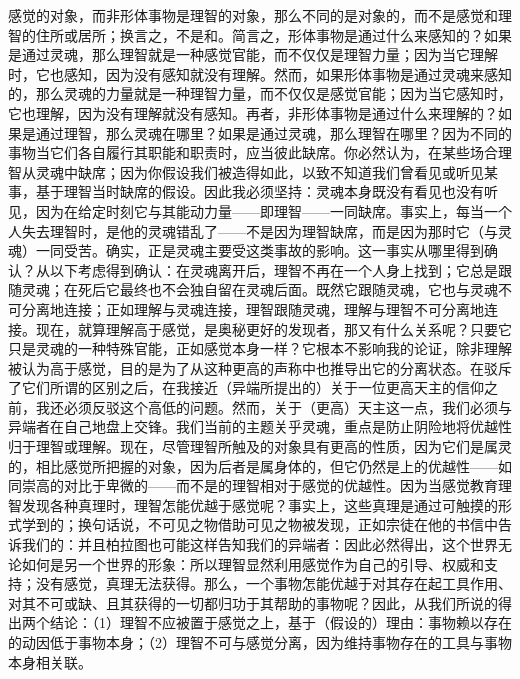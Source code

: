 感觉的对象，而非形体事物是理智的对象，那么不同的是对象的，而不是感觉和理智的住所或居所；换言之，不是和。简言之，形体事物是通过什么来感知的？如果是通过灵魂，那么理智就是一种感觉官能，而不仅仅是理智力量；因为当它理解时，它也感知，因为没有感知就没有理解。然而，如果形体事物是通过灵魂来感知的，那么灵魂的力量就是一种理智力量，而不仅仅是感觉官能；因为当它感知时，它也理解，因为没有理解就没有感知。再者，非形体事物是通过什么来理解的？如果是通过理智，那么灵魂在哪里？如果是通过灵魂，那么理智在哪里？因为不同的事物当它们各自履行其职能和职责时，应当彼此缺席。你必然认为，在某些场合理智从灵魂中缺席；因为你假设我们被造得如此，以致不知道我们曾看见或听见某事，基于理智当时缺席的假设。因此我必须坚持：灵魂本身既没有看见也没有听见，因为在给定时刻它与其能动力量——即理智——一同缺席。事实上，每当一个人失去理智时，是他的灵魂错乱了——不是因为理智缺席，而是因为那时它（与灵魂）一同受苦。确实，正是灵魂主要受这类事故的影响。这一事实从哪里得到确认？从以下考虑得到确认：在灵魂离开后，理智不再在一个人身上找到；它总是跟随灵魂；在死后它最终也不会独自留在灵魂后面。既然它跟随灵魂，它也与灵魂不可分离地连接；正如理解与灵魂连接，理智跟随灵魂，理解与理智不可分离地连接。现在，就算理解高于感觉，是奥秘更好的发现者，那又有什么关系呢？只要它只是灵魂的一种特殊官能，正如感觉本身一样？它根本不影响我的论证，除非理解被认为高于感觉，目的是为了从这种更高的声称中也推导出它的分离状态。在驳斥了它们所谓的区别之后，在我接近（异端所提出的）关于一位更高天主的信仰之前，我还必须反驳这个高低的问题。然而，关于（更高）天主这一点，我们必须与异端者在自己地盘上交锋。我们当前的主题关乎灵魂，重点是防止阴险地将优越性归于理智或理解。现在，尽管理智所触及的对象具有更高的性质，因为它们是属灵的，相比感觉所把握的对象，因为后者是属身体的，但它仍然是上的优越性——如同崇高的对比于卑微的——而不是的理智相对于感觉的优越性。因为当感觉教育理智发现各种真理时，理智怎能优越于感觉呢？事实上，这些真理是通过可触摸的形式学到的；换句话说，不可见之物借助可见之物被发现，正如宗徒在他的书信中告诉我们的：并且柏拉图也可能这样告知我们的异端者：因此必然得出，这个世界无论如何是另一个世界的形象：所以理智显然利用感觉作为自己的引导、权威和支持；没有感觉，真理无法获得。那么，一个事物怎能优越于对其存在起工具作用、对其不可或缺、且其获得的一切都归功于其帮助的事物呢？因此，从我们所说的得出两个结论：（1）理智不应被置于感觉之上，基于（假设的）理由：事物赖以存在的动因低于事物本身；（2）理智不可与感觉分离，因为维持事物存在的工具与事物本身相关联。\par

